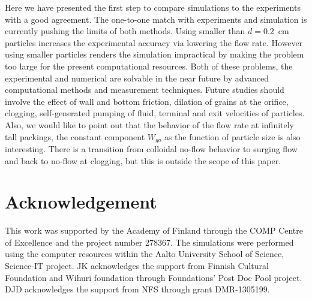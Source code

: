 \documentclass[twoside,twocolumn,9pt]{article}
\begin{document}
Here we have presented the first step to compare simulations to the experiments with a good 
agreement. The one-to-one match with experiments and simulation is currently pushing the 
limits of both methods.
Using smaller than $d=0.2$~cm particles increases the experimental accuracy via lowering the flow rate. 
However using smaller particles renders the simulation impractical by making the problem too large for the present computational resources. Both of these problems, the experimental and numerical are solvable in the near future by advanced computational methods and measurement techniques. 
Future studies should involve 
the effect of wall and bottom friction, dilation of grains at the orifice, clogging, self-generated pumping of fluid, terminal and exit velocities of particles. 
Also, we would like to point out that the behavior of the flow rate at infinitely 
tall packings, the constant component $W_{go}$  as the function of particle size 
is also interesting. There is a transition from colloidal no-flow behavior to surging flow and back to no-flow 
at clogging, but this is outside the scope of this paper.


\section{Acknowledgement}

This work was supported by the Academy of Finland
through the COMP Centre of Excellence and the project
number 278367. The simulations were performed using
the computer resources within the Aalto University
School of Science, Science-IT project. JK acknowledges 
the support from Finnish Cultural Foundation and Wihuri 
foundation through Foundations' Post Doc Pool project. 
DJD acknowledges the support from NFS through grant 
DMR-1305199.


\end{document}
